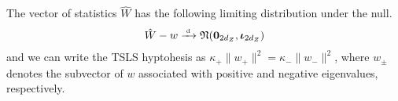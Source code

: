 The vector of statistics \(\hat W\) has the following limiting distribution under the null.
\begin{align}
\hat W - w\xrightarrow{{\scriptscriptstyle \mathrm{\;d\;}}} \mathfrak{N}(\mathbf{0}_{2d_Z},\boldsymbol{\iota}_{2d_Z})
\end{align}
and we can write the TSLS hyptohesis as \(\kappa_+\lVert w_+ \rVert^2 = \kappa_-\lVert w_- \rVert^2\), where \(w_\pm\) denotes the subvector of \(w\) associated with positive and negative eigenvalues, respectively.

